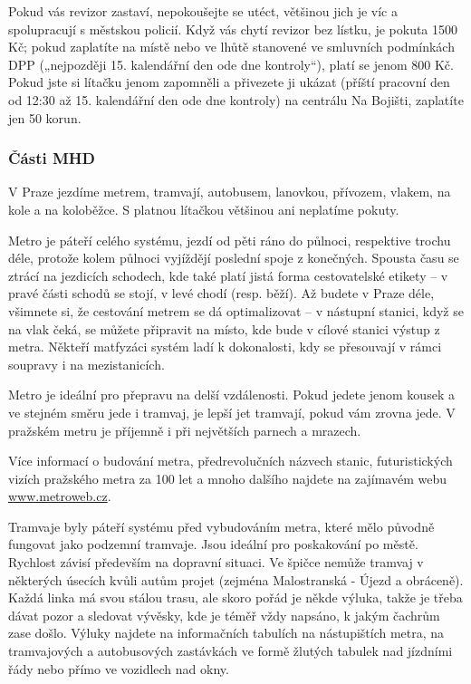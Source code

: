 Pokud vás revizor zastaví, nepokoušejte se utéct, většinou jich je víc a
spolupracují s městskou policií. Když vás chytí revizor bez lístku, je pokuta
1500 Kč; pokud zaplatíte na místě nebo ve lhůtě stanovené ve smluvních
podmínkách DPP („nejpozději 15. kalendářní den ode dne kontroly“), platí se
jenom 800 Kč. Pokud jste si lítačku jenom zapomněli a přivezete ji ukázat
(příští pracovní den od 12:30 až 15. kalendářní den ode dne kontroly) na
centrálu Na Bojišti, zaplatíte jen 50 korun.


\subsubsection{Části MHD}
V Praze jezdíme metrem, tramvají, autobusem, lanovkou, přívozem, vlakem, na kole
a na koloběžce. S platnou lítačkou většinou ani neplatíme pokuty.


Metro je páteří celého systému, jezdí od pěti ráno do půlnoci, respektive trochu
déle, protože kolem půlnoci vyjíždějí poslední spoje z konečných. Spousta času
se ztrácí na jezdicích schodech, kde také platí jistá forma cestovatelské
etikety – v pravé části schodů se stojí, v levé chodí (resp. běží). Až budete v
Praze déle, všimnete si, že cestování metrem se dá optimalizovat – v nástupní
stanici, když se na vlak čeká, se můžete připravit na místo, kde bude v cílové
stanici výstup z metra. Někteří matfyzáci systém ladí k dokonalosti, kdy se
přesouvají v rámci soupravy i na mezistanicích.

Metro je ideální pro přepravu na delší vzdálenosti. Pokud jedete jenom kousek a
ve stejném směru jede i tramvaj, je lepší jet tramvají, pokud vám zrovna jede. V
pražském metru je příjemně i při největších parnech a mrazech.

Více informací o budování metra, předrevolučních názvech stanic, futuristických
vizích pražského metra za 100 let a mnoho dalšího najdete na zajímavém webu
\url{www.metroweb.cz}.


Tramvaje byly páteří systému před vybudováním metra, které mělo původně fungovat
jako podzemní tramvaje. Jsou ideální pro poskakování po městě. Rychlost závisí
především na dopravní situaci. Ve špičce nemůže tramvaj v některých úsecích
kvůli autům projet (zejména Malostranská - Újezd a obráceně). Každá linka má
svou stálou trasu, ale skoro pořád je někde výluka, takže je třeba dávat pozor a
sledovat vývěsky, kde je téměř vždy napsáno, k jakým čachrům zase došlo. Výluky
najdete na informačních tabulích na nástupištích metra, na tramvajových a
autobusových zastávkách ve formě žlutých tabulek nad jízdními řády nebo přímo ve
vozidlech nad okny.

